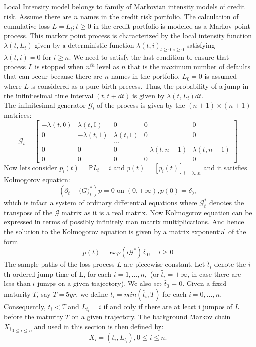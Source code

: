 Local Intensity model belongs to family of Markovian intensity models of credit risk.  Assume there are $n$ names in the credit risk portfolio. The calculation of cumulative loss $L = {L_{t};t \geq 0}$ in the credit portfolio is modeled as a Markov point process. This markov point process is characterized by the local intensity function $\lambda(t,L_{t})$ given by a deterministic function ${\lambda(t,i)}_{t \geq 0,i \geq 0}$ satisfying $\lambda(t,i) = 0$ for $ i \geq n$. We need to satisfy the last condition to ensure that process $L$ is stopped when $n^{th}$ level as $n$ that is the maximum number of defaults that can occur because there are $n$ names in the portfolio. $L_{0} = 0$ is assumed where $L$ is considered as a pure birth process. Thus, the probability of a jump in the infinitesimal time interval $(t,t+dt)$ is given by $\lambda(t,L_{t})dt$. \\
The infinitesimal generator $\mathcal{G}_{t}$ of the process is given by the $(n+1) \times (n+1)$ matrices: \\
\[\mathcal{G}_{t} = 
	\begin{bmatrix}
-\lambda(t,0)& \lambda(t,0) & 0 & 0 & 0 \\
0 & -\lambda(t,1)& \lambda(t,1)  & 0 & 0 \\
 & &\dots & & \\
 0 & 0 & 0 & -\lambda(t,n-1)& \lambda(t,n-1) \\
 0 & 0 & 0 & 0 & 0
\end{bmatrix}
\]
Now lets consider $p_{i}(t) = \mathbb{P}{L_{t}=i}$ and $p(t) = [p_{i}(t)]_{i=0 \dots n}$ and it satisfies Kolmogorov equation:
\begin{equation}
\left(\partial_{t} - \mathcal(G)_{t}^{*}\right)p = 0 \text{ on } (0,+\infty), p(0) = \delta_{0},
\end{equation} 
which is infact a system of ordinary differential equations where $\mathcal{G}_{t}^{*}$ denotes the transpose of the $\mathcal{G}$ matrix as it is a real matrix. Now Kolmogorov equation can be expressed in terms of possibly infinitely man matrix multiplications. And hence the solution to the Kolmogorov equation is given by a matrix exponential  of the form \\
\begin{equation}
p(t) = exp(t\mathcal{G}^{*})\delta_{0}, \quad t \geq 0
\end{equation}
The sample paths of the loss process $L$ are piecewise constant. Let $\tilde{t_{i}}$ denote the $i$th ordered jump time of L, for each $i = 1, \dots , n,$ (or $\tilde{t_{i}}  = + \infty$, in case there are less than $i$ jumps on a given trajectory). We also set $\tilde{t_{0}} = 0 $. Given a fixed maturity $T$, say $ T = 5yr$, we define $t_{i} = min(\tilde{t_{i}},T)$ for each $i = 0, \dots, n$. Consequently, $t_{i} < T$ and $L_{t_{i}} = i$ if and only if there are at least i jumpos of $L$ before the maturity $T$ on a given trajectory. The background Markov chain ${X_{i}}_{0 \leq i \leq n}$ and used in this section is then defined by: \\
\begin{equation}
X_{i} = (t_{i}, L_{t_{i}}), 0 \leq i \leq n.
\end{equation}
